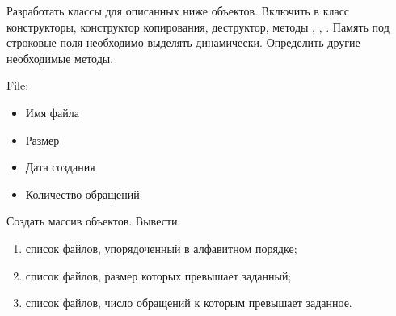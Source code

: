 
Разработать классы для описанных ниже объектов. Включить в класс
конструкторы, конструктор копирования, деструктор, методы ,
, . Память под строковые поля необходимо выделять
динамически. Определить другие необходимые методы.

File:
\begin{itemize}
	\item Имя файла
	\item Размер
	\item Дата создания
	\item Количество обращений
\end{itemize}

Создать массив объектов. Вывести:
\begin{enumerate}
	\item список файлов, упорядоченный в алфавитном порядке;
	\item список файлов, размер которых превышает заданный;
	\item список файлов, число обращений к которым превышает заданное.
\end{enumerate}
